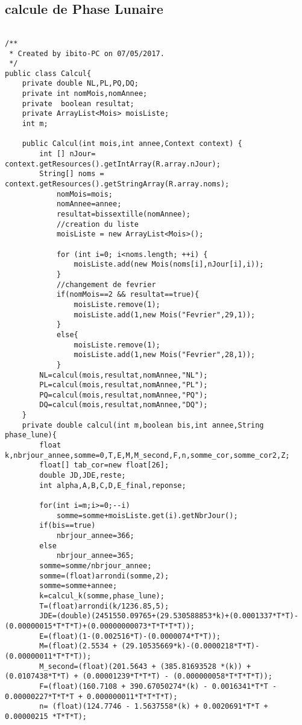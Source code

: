 	\subsection{calcule de Phase Lunaire}
		\begin{lstlisting}

/**
 * Created by ibito-PC on 07/05/2017.
 */
public class Calcul{
    private double NL,PL,PQ,DQ;
    private int nomMois,nomAnnee;
    private  boolean resultat;
    private ArrayList<Mois> moisListe;
    int m;

    public Calcul(int mois,int annee,Context context) {
        int [] nJour= context.getResources().getIntArray(R.array.nJour);
        String[] noms = context.getResources().getStringArray(R.array.noms);
            nomMois=mois;
            nomAnnee=annee;
            resultat=bissextille(nomAnnee);
            //creation du liste
            moisListe = new ArrayList<Mois>();

            for (int i=0; i<noms.length; ++i) {
                moisListe.add(new Mois(noms[i],nJour[i],i));
            }
            //changement de fevrier
            if(nomMois==2 && resultat==true){
                moisListe.remove(1);
                moisListe.add(1,new Mois("Fevrier",29,1));
            }
            else{
                moisListe.remove(1);
                moisListe.add(1,new Mois("Fevrier",28,1));
            }
        NL=calcul(mois,resultat,nomAnnee,"NL");
        PL=calcul(mois,resultat,nomAnnee,"PL");
        PQ=calcul(mois,resultat,nomAnnee,"PQ");
        DQ=calcul(mois,resultat,nomAnnee,"DQ");
    }
    private double calcul(int m,boolean bis,int annee,String phase_lune){
        float k,nbrjour_annee,somme=0,T,E,M,M_second,F,n,somme_cor,somme_cor2,Z;
        float[] tab_cor=new float[26];
        double JD,JDE,reste;
        int alpha,A,B,C,D,E_final,reponse;

        for(int i=m;i>=0;--i)
            somme=somme+moisListe.get(i).getNbrJour();
        if(bis==true)
            nbrjour_annee=366;
        else
            nbrjour_annee=365;
        somme=somme/nbrjour_annee;
        somme=(float)arrondi(somme,2);
        somme=somme+annee;
        k=calcul_k(somme,phase_lune);
        T=(float)arrondi(k/1236.85,5);
        JDE=(double)(2451550.09765+(29.530588853*k)+(0.0001337*T*T)-(0.00000015*T*T*T)+(0.00000000073*T*T*T*T));
        E=(float)(1-(0.002516*T)-(0.0000074*T*T));
        M=(float)(2.5534 + (29.10535669*k)-(0.0000218*T*T)- (0.00000011*T*T*T));
        M_second=(float)(201.5643 + (385.81693528 *(k)) + (0.0107438*T*T) + (0.00001239*T*T*T) - (0.000000058*T*T*T*T));
        F=(float)(160.7108 + 390.67050274*(k) - 0.0016341*T*T - 0.00000227*T*T*T + 0.000000011*T*T*T*T);
        n= (float)(124.7746 - 1.5637558*(k) + 0.0020691*T*T + 0.00000215 *T*T*T);


\end{lstlisting}
